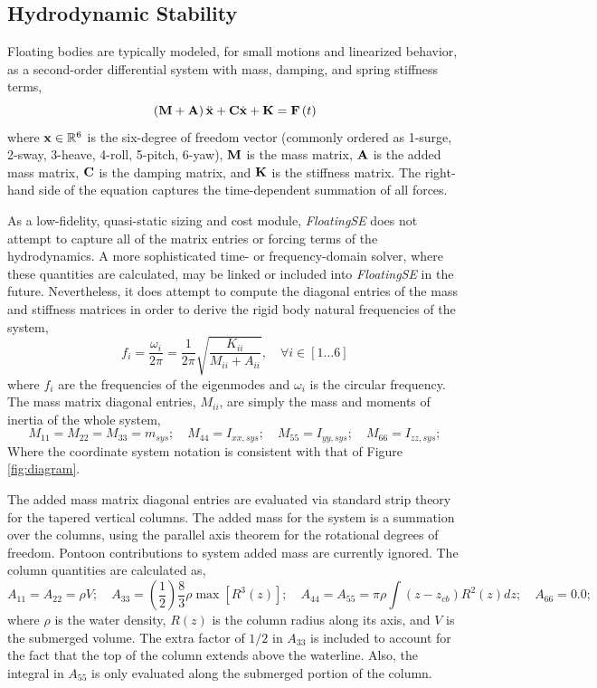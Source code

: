 \subsection{Hydrodynamic Stability}
Floating bodies are typically modeled, for small motions and linearized
behavior, as a second-order differential system with mass, damping, and
spring stiffness terms,
\begin{equation}
  \left(\mathbf{M} + \mathbf{A}\right)\ddot{\mathbf{x}} + \mathbf{C}\dot{\mathbf{x}} +
  \mathbf{K} = \mathbf{F}\left( t \right)
\end{equation}
where $\mathbf{x}\in\mathbb{R}^6$ is the six-degree of freedom vector
(commonly ordered as 1-surge, 2-sway, 3-heave, 4-roll, 5-pitch,
6-yaw), $\mathbf{M}$ is the mass matrix, $\mathbf{A}$ is the added mass
matrix, $\mathbf{C}$ is the damping matrix, and $\mathbf{K}$ is the stiffness
matrix.  The right-hand side of the equation captures the time-dependent
summation of all forces.

As a low-fidelity, quasi-static sizing and cost module,
\textit{FloatingSE} does not attempt to capture all of the matrix
entries or forcing terms of the hydrodynamics.  A more sophisticated
time- or frequency-domain solver, where these quantities are calculated,
may be linked or included into \textit{FloatingSE} in the future.
Nevertheless, it does attempt to compute the diagonal entries of the
mass and stiffness matrices in order to derive the rigid body natural
frequencies of the system,
\begin{equation}
  f_i = \frac{\omega_i}{2\pi} =
  \frac{1}{2\pi}\sqrt{\frac{K_{ii}}{M_{ii}+A_{ii}}}, \quad \forall i \in
  \left[1\ldots6\right]
\end{equation}
where $f_i$ are the frequencies of the eigenmodes and $\omega_i$ is the
circular frequency.  The mass matrix diagonal entries, $M_{ii}$, are simply the mass and
moments of inertia of the whole system,
\begin{equation}
  M_{11} = M_{22} = M_{33} = m_{sys};\quad M_{44} = I_{xx,sys};\quad M_{55} = I_{yy,sys};\quad M_{66} = I_{zz,sys};
\end{equation}
Where the coordinate system notation is consistent with that of Figure
\ref{fig:diagram}.

The added mass matrix diagonal entries are evaluated via standard strip
theory for the tapered vertical columns.  The added mass for the system is a
summation over the columns, using the parallel axis theorem for the
rotational degrees of freedom.  Pontoon contributions to system added
mass are currently ignored.  The column quantities are calculated as,
\begin{equation}
  A_{11} = A_{22} = \rho V;\quad A_{33} = 
  \left(\frac{1}{2}\right)\frac{8}{3} \rho \max \left[ R^3(z)\right] ; \quad A_{44} =
  A_{55} = \pi\rho\int\left(z-z_{cb}\right)R^2(z)dz;\quad A_{66} = 0.0;
\end{equation}
where $\rho$ is the water density, $R(z)$ is the column radius along its
axis, and $V$ is the submerged volume.  The extra factor of $1/2$ in
$A_{33}$ is included to account for the fact that the top of the column
extends above the waterline.  Also, the integral in $A_{55}$ is only evaluated
along the submerged portion of the column.

